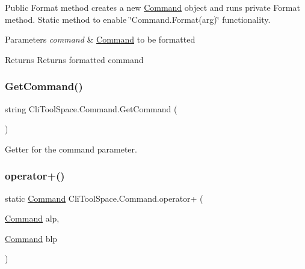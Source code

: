 Public Format method creates a new \mbox{\hyperlink{class_cli_tool_space_1_1_command}{Command}} object and runs private Format method. Static method to enable \char`\"{}\+Command.\+Format(arg)\char`\"{} functionality. 


\begin{DoxyParams}{Parameters}
{\em command} & \mbox{\hyperlink{class_cli_tool_space_1_1_command}{Command}} to be formatted\\
\hline
\end{DoxyParams}
\begin{DoxyReturn}{Returns}
Returns formatted command
\end{DoxyReturn}
\mbox{\label{class_cli_tool_space_1_1_command_a6580ca3f6b4ad7f4be3dfc968e317c20}} 
\subsubsection{\texorpdfstring{GetCommand()}{GetCommand()}}
{\footnotesize\ttfamily string Cli\+Tool\+Space.\+Command.\+Get\+Command (\begin{DoxyParamCaption}{ }\end{DoxyParamCaption})}



Getter for the command parameter. 

\mbox{\label{class_cli_tool_space_1_1_command_a2138b4c3df7aeee1aee67a188ff514b4}} 
\subsubsection{\texorpdfstring{operator+()}{operator+()}}
{\footnotesize\ttfamily static \mbox{\hyperlink{class_cli_tool_space_1_1_command}{Command}} Cli\+Tool\+Space.\+Command.\+operator+ (\begin{DoxyParamCaption}\item[{\mbox{\hyperlink{class_cli_tool_space_1_1_command}{Command}}}]{alp,  }\item[{\mbox{\hyperlink{class_cli_tool_space_1_1_command}{Command}}}]{blp }\end{DoxyParamCaption})\hspace{0.3cm}{\ttfamily [static]}}



